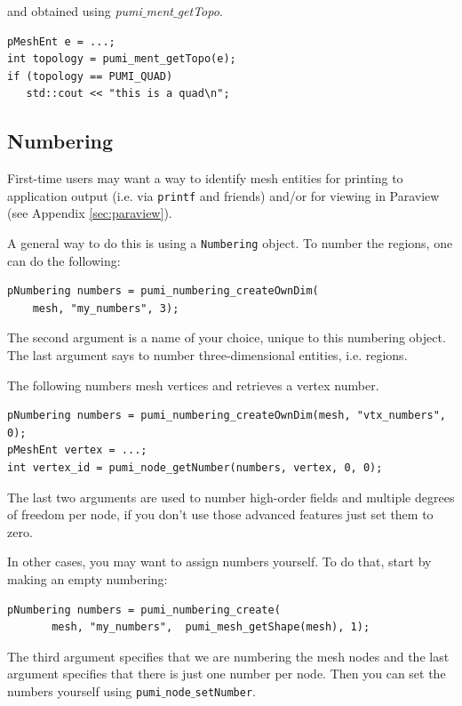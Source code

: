 \documentclass{article}
\begin{document}
and obtained using \emph{pumi$\_$ment$\_$getTopo}.

\begin{lstlisting}
pMeshEnt e = ...;
int topology = pumi_ment_getTopo(e);
if (topology == PUMI_QUAD)
   std::cout << "this is a quad\n";
\end{lstlisting}

\subsection{Numbering}
\label{sec:num}

First-time users may want a way to identify mesh entities for
printing to application output (i.e. via \texttt{printf} and friends)
and/or for viewing in Paraview (see Appendix \ref{sec:paraview}).

A general way to do this is using a \texttt{Numbering} object.
To number the regions, one can do the following:

\begin{lstlisting}
pNumbering numbers = pumi_numbering_createOwnDim(
    mesh, "my_numbers", 3);
\end{lstlisting}

The second argument is a name of your choice, unique to this numbering object.
The last argument says to number three-dimensional entities, i.e. regions.

The following numbers mesh vertices and retrieves a vertex number.

\begin{lstlisting}
pNumbering numbers = pumi_numbering_createOwnDim(mesh, "vtx_numbers", 0);
pMeshEnt vertex = ...;
int vertex_id = pumi_node_getNumber(numbers, vertex, 0, 0);
\end{lstlisting}

The last two arguments are used to number high-order fields and
multiple degrees of freedom per node, if you don't use those
advanced features just set them to zero.

In other cases, you may want to assign numbers yourself.
To do that, start by making an empty numbering:

\begin{lstlisting}
pNumbering numbers = pumi_numbering_create(
       mesh, "my_numbers",  pumi_mesh_getShape(mesh), 1);
\end{lstlisting}

The third argument specifies that we are numbering the mesh
nodes and the last argument specifies that there is just one
number per node. 
Then you can set the numbers yourself using \texttt{pumi$\_$node$\_$setNumber}.
\end{document}

